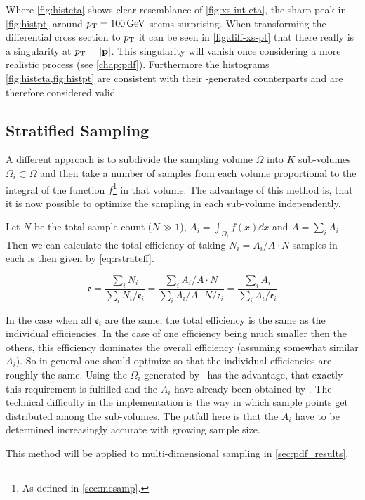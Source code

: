 Where \cref{fig:histeta} shows clear resemblance of
\cref{fig:xs-int-eta}, the sharp peak in \cref{fig:histpt} around
\(p_\mathrm{T}=\SI{100}{\giga\electronvolt}\) seems surprising. When
transforming the differential cross section to \(p_\mathrm{T}\) it can be seen
in \cref{fig:diff-xs-pt} that there really is a singularity at
\(p_\mathrm{T} =\abs{\vb{p}}\). This singularity will vanish once considering a
more realistic process (see \cref{chap:pdf}). Furthermore the
histograms \cref{fig:histeta,fig:histpt} are consistent
with their \rivet-generated counterparts and are therefore considered
valid.


\subsection{Stratified Sampling}
\label{sec:stratsamp-real}

A different approach is to subdivide the sampling volume \(\Omega\)
into \(K\) sub-volumes \(\Omega_i\subset\Omega\) and then take a
number of samples from each volume proportional to the integral of the
function \(f\)\footnote{As defined in \cref{sec:mcsamp}.} in that
volume. The advantage of this method is, that it is now possible to
optimize the sampling in each sub-volume independently.

Let \(N\) be the total sample count (\(N\gg 1\)),
\(A_i = \int_{\Omega_i}f(x)\dd{x}\) and \(A=\sum_iA_i\).
Then we can calculate the total efficiency of taking \(N_i=A_i/A \cdot N\)
samples in each is then given by \cref{eq:rstrateff}.

\begin{equation}
  \label{eq:rstrateff}
  \mathfrak{e} = \frac{\sum_i N_i}{\sum_i N_i/\mathfrak{e}_i} =
  \frac{\sum_i A_i/A\cdot N}{\sum_i A_i/A\cdot N/ \mathfrak{e}_i} = \frac{\sum_i A_i}{\sum_i A_i/\mathfrak{e}_i}
\end{equation}

In the case when all \(\mathfrak{e}_i\) are the same, the total
efficiency is the same as the individual efficiencies. In the case of
one efficiency being much smaller then the others, this efficiency
dominates the overall efficiency (assuming somewhat similar
\(A_i\)). So in general one should optimize so that the individual
efficiencies are roughly the same. Using the \(\Omega_i\) generated by
\vegas\ has the advantage, that exactly this requirement is fulfilled
and the \(A_i\) have already been obtained by \vegas. The technical
difficulty in the implementation is the way in which sample points get
distributed among the sub-volumes. The pitfall here is that the
\(A_i\) have to be determined increasingly accurate with growing
sample size.


This method will be applied to multi-dimensional sampling in
\cref{sec:pdf_results}.

